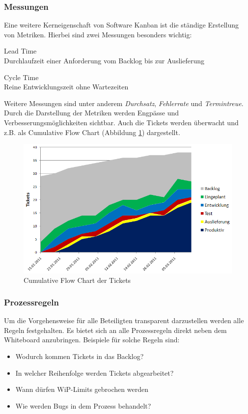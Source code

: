 \subsubsection{Messungen}
Eine weitere Kerneigenschaft von Software Kanban ist die ständige Erstellung von Metriken. Hierbei sind zwei Messungen besonders wichtig:
\begin{description}
  \item Lead Time\\ Durchlaufzeit einer Anforderung vom Backlog bis zur Auslieferung
  \item Cycle Time\\ Reine Entwicklungszeit ohne Wartezeiten
\end{description}
Weitere Messungen sind unter anderem \emph{Durchsatz}, \emph{Fehlerrate} und \emph{Termintreue}. Durch die Darstellung der Metriken werden Engpässe und Verbesserungsmöglichkeiten sichtbar. Auch die Tickets werden überwacht und z.B. als Cumulative Flow Chart (Abbildung \ref{fig:kanbanChart}) dargestellt.

\begin{figure}[h]
  \centering
  \includegraphics[width=1\textwidth]{images/kanbanChart}
  \caption{Cumulative Flow Chart der Tickets}
  \label{fig:kanbanChart}
\end{figure}

\subsubsection{Prozessregeln}
Um die Vorgehensweise für alle Beteiligten transparent darzustellen werden alle Regeln festgehalten. Es bietet sich an alle Prozessregeln direkt neben dem Whiteboard anzubringen. Beispiele für solche Regeln sind:
\begin{itemize}
  \item Wodurch kommen Tickets in das Backlog?
  \item In welcher Reihenfolge werden Tickets abgearbeitet?
  \item Wann dürfen WiP-Limits gebrochen werden
  \item Wie werden Bugs in dem Prozess behandelt?
\end{itemize}

